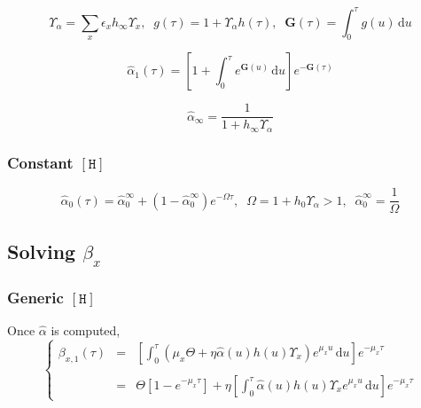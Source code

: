 \documentclass[aps,onecolumn,10pt]{revtex4}
\newcommand{\mychem}[1]{\mathtt{#1}}
\newcommand{\myconc}[1]{\left\lbrack{#1}\right\rbrack}
\newcommand{\spproton}{\mychem{H}}
\newcommand{\proton}{\myconc{\spproton}}
\newcommand{\ig}{\ensuremath{\mathbf{G}}}
\begin{document}
\begin{equation}
	\Upsilon_\alpha = \sum_x \epsilon_x h_\infty \Upsilon_x,\;\;g(\tau) = 1+\Upsilon_\alpha h(\tau), \;\; \ig(\tau) = \int_0^\tau g(u) \, \mathrm{d} u
\end{equation}

\begin{equation}
	\hat\alpha_1(\tau) = \left[ 1 + \int_0^{\tau} e^{\ig(u)}\,\mathrm{d} u\right] e^{-\ig(\tau)}
\end{equation}

\begin{equation}
	\hat\alpha_\infty = \dfrac{1}{1+h_\infty \Upsilon_\alpha}
\end{equation}

\subsubsection{Constant $\proton$}
\begin{equation}
	\hat\alpha_0(\tau) = {\hat\alpha_0^\infty + \left(1-\hat\alpha_0^\infty\right) e^{-\Omega \tau} },
	\;\;\Omega=1+h_0\Upsilon_\alpha>1,
	\;\;\hat\alpha_0^\infty = \dfrac{1}{\Omega}
\end{equation}

\subsection{Solving $\beta_x$}

\subsubsection{Generic $\proton$}
Once $\hat\alpha$ is computed,
\begin{equation}
\left\lbrace
\begin{array}{rcl}
\beta_{x,1}(\tau) & = & \displaystyle \left[ \int_0^\tau \left( \mu_x \Theta + \eta \hat\alpha(u) h(u) \Upsilon_x \right)e^{\mu_x u} \, \mathrm{d} u \right] e^{-\mu_x\tau}\\
\\
& = & \displaystyle \Theta \left[ 1-e^{-\mu_x \tau}\right] + \eta \left[\int_0^\tau    \hat\alpha(u) h(u) \Upsilon_x  e^{\mu_x u} \, \mathrm{d} u\right] e^{-\mu_x \tau} 
\end{array}
\right.
\end{equation}
\end{document}
